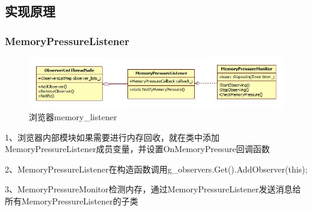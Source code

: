 \subsection{实现原理}
\subsubsection{MemoryPressureListener}
\begin{figure}[H]
  \centering
  \includegraphics[width=\textwidth]{image/tbrw2_app_optimization/tbrw_memory_monitor.jpg}
  \caption{浏览器memory\_listener}
\end{figure}
1、浏览器内部模块如果需要进行内存回收，就在类中添加MemoryPressureListener成员变量，并设置OnMemoryPressure回调函数\par
2、MemoryPressureListener在构造函数调用g\_observers.Get().AddObserver(this);\par
3、MemoryPressureMonitor检测内存，通过MemoryPressureListener发送消息给所有MemoryPressureListener的子类\par

